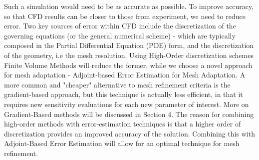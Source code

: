 Such a simulation would need to be as accurate as possible. To improve accuracy, so that CFD results can be closer to those from experiment, we need to reduce error. Two  key sources of error within CFD include the discretization of the governing equations (or the general numerical scheme) - which are typically composed in the Partial Differential Equation (PDE) form, and the discretization of the geometry, i.e the mesh resolution. Using High-Order discretization schemes Finite Volume Methods will reduce the former, while we choose a novel approach for mesh adaptation - Adjoint-based Error Estimation for Mesh Adaptation. A more common and "cheaper" alternative to mesh refinement criteria is the gradient-based approach, but this technique is actually less efficient, in that it requires new sensitivity evaluations for each new parameter of interest. More on Gradient-Based methods will be discussed in Section 4. The reason for combining high-order methods with error-estimation techniques is that a higher order of discretization provides an improved accuracy of the solution. Combining this with Adjoint-Based Error Estimation will allow for an optimal technique for mesh refinement.\par 